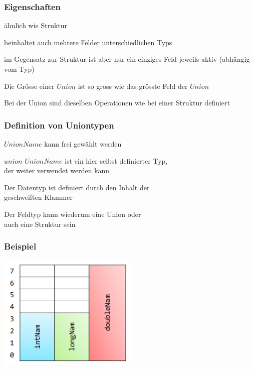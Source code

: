 		\subsubsection{Eigenschaften}
			\begin{compactitem}
				\item ähnlich wie Struktur
				\item beinhaltet auch mehrere Felder unterschiedlichen Typs
				\item im Gegensatz zur Struktur ist aber nur ein einziges Feld jeweils aktiv (abhängig vom Typ)
				\item Die Grösse einer $Union$ ist so gross wie das grösste Feld der $Union$
				\item Bei der Union sind dieselben Operationen wie bei einer Struktur definiert 
			\end{compactitem}	
		\begin{minipage}[t]{10 cm}
			\subsubsection{Definition von Uniontypen}
				\vspace*{-0.2cm}
				
				\vspace*{0.3cm}
					\begin{compactitem}
						\item $UnionName$ kann frei gewählt werden
						\item $union$ $UnionName$ ist ein hier selbst definierter Typ, \\der weiter verwendet werden kann
						\item Der Datentyp ist definiert durch den Inhalt der \\geschweiften Klammer
						\item Der Feldtyp kann wiederum eine Union oder \\auch eine Struktur sein
					\end{compactitem}
		\end{minipage}
		\hspace*{1.5cm}	
		\begin{minipage}[t]{8 cm}
			\subsubsection{Beispiel}
				\vspace*{-0.2cm}
				
				\vspace*{0.5cm}
				\includegraphics[width=0.5\textwidth]{pics/union.png}
		\end{minipage}
		\vspace*{0.8cm}
